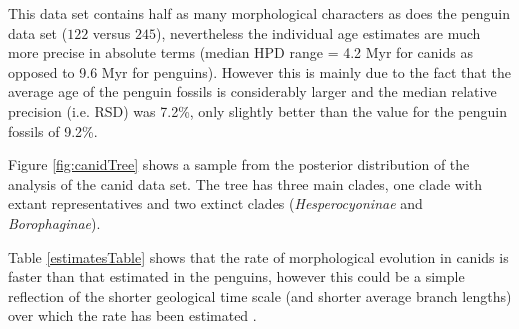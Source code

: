\documentclass[11pt]{article}
\begin{document}
This data set contains half as many morphological characters as does the penguin data set ($122$ versus $245$), nevertheless the individual age estimates are much more precise in absolute terms (median HPD range = 4.2 Myr for canids as opposed to 9.6 Myr for penguins). However this is mainly due to the fact that the average age of the penguin fossils is considerably larger and the median relative precision (i.e. RSD) was 7.2\%, only slightly better than the value for the penguin fossils of 9.2\%.

Figure \ref{fig:canidTree} shows a sample from the posterior distribution of the analysis of the canid data set. The tree has three main clades, one clade with extant representatives and two extinct clades ({\it Hesperocyoninae} and {\it Borophaginae}).

Table \ref{estimatesTable} shows that the rate of morphological evolution in canids is faster than that estimated in the penguins, however this could be a simple reflection of the shorter geological time scale (and shorter average branch lengths) over which the rate has been estimated \cite{Gingerich1993}.
\end{document}
